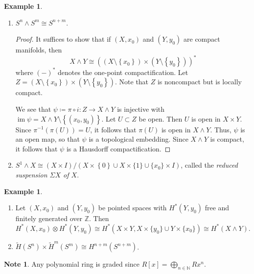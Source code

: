 \documentclass[10pt,letterpaper,cm]{nupset}
\theoremstyle{definition}
\newtheorem{exmp}[definition]{Example}
\newtheorem{note}[definition]{Note}
\theoremstyle{theorem}
\theoremstyle{remark}
\newcommand{\N}{\mathbb N}
\newcommand{\Z}{\mathbb Z}
\newcommand{\1}{\mathbb{1}}
\newcommand{\0}{\vec 0}
\DeclareMathOperator{\im}{im}
\begin{document}
\begin{exmp} $ $
\begin{enumerate}
\item $S^n \wedge  S^m \cong S^{n+m}$.
\begin{proof}
 It suffices to show that if $\left(X, x_0\right)$ and $\left(Y, y_0\right)$ are compact manifolds, then $$X \wedge Y \cong \left(\left(X \setminus \left\{x_0\right\}\right) \times \left(Y \setminus \left\{y_0\right\}\right)\right)^{\ast}$$ where $\left({-}\right)^{\ast}$ denotes the one-point compactification. Let $Z =   \left(X \setminus \left\{x_0\right\}\right) \times \left(Y \setminus \left\{y_0\right\}\right)$. Note that $Z$ is noncompact but is locally compact. 
 
 We see that $\psi \coloneqq  \pi \circ i : Z \to X \wedge Y$ is injective with $\im{\psi} = X \wedge Y \setminus \left\{\left(x_0, y_0\right)\right\}$. Let $U \subset Z$ be open. Then $U$ is open in $X \times Y$.  Since $\pi^{-1}(\pi(U)) = U$, it follows that $\pi(U)$ is open in $X \wedge Y$. Thus, $\psi$ is an open map, so that $\psi$ is a topological embedding. Since $X \wedge Y$ is compact, it follows that $\psi$ is a Hausdorff compactification. 
\end{proof}
\item $S^1 \wedge X \cong \left(X\times I\right)/\left(X\times \left\{0\right\}\cup X\times \{1\}\cup \{x_{0}\}\times I\right)$, called the \textit{reduced suspension $\Sigma{X}$ of $X$}.
\end{enumerate}
\end{exmp}

\begin{exmp} $ $
\begin{enumerate}
\item Let $\left(X, x_0\right)$ and $\left(Y, y_0\right)$ be pointed spaces with $H^{\ast}\left(Y, y_0\right)$ free and finitely generated over $\Z$. Then $H^{\ast}\left(X, x_0\right) \otimes H^{\ast}\left(Y, y_0\right) \cong H^{\ast}(X \times Y, X \times \{y_0\} \cup Y \times \{x_0\}) \cong H^{\ast}(X \wedge Y)    .$
\item  $\widetilde{H}(S^n) \times \widetilde{H}^m(S^m) \cong H^{n+m}(S^{n+m})$.
\end{enumerate}
\end{exmp}

\bigskip

\begin{note}
Any polynomial ring is graded since $R[x] = \bigoplus_{n \in \N} Rx^n$.
\end{note}
\end{document}
